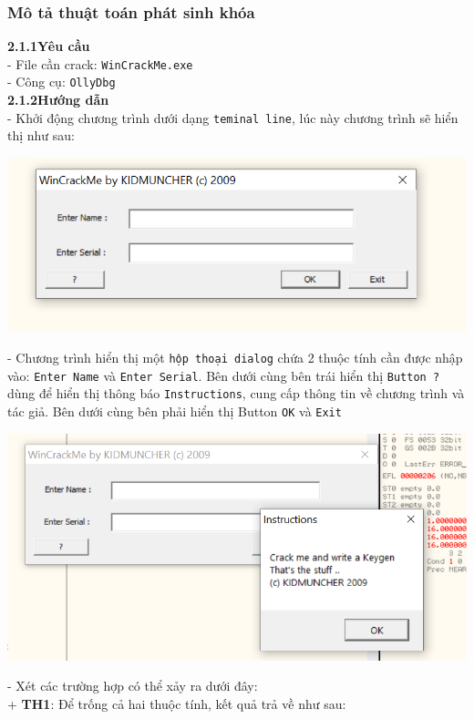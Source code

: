 \subsubsection{Mô tả thuật toán phát sinh khóa}
\noindent\textbf{2.1.1\quad Yêu cầu}\\
- File cần crack: \texttt{WinCrackMe.exe}\\
- Công cụ: \texttt{OllyDbg}\\
\noindent\textbf{2.1.2\quad Hướng dẫn}\\
- Khởi động chương trình dưới dạng \texttt{teminal line}, lúc này chương trình sẽ hiển thị như sau:
\begin{center}
    \includegraphics[width=\textwidth]{img/file-2/demo1.PNG}
\end{center}
- Chương trình hiển thị một  \texttt{hộp thoại dialog} chứa 2 thuộc tính cần được nhập vào: \texttt{Enter Name} và \texttt{Enter Serial}. Bên dưới cùng bên trái hiển thị \texttt{Button ?} dùng để hiển thị thông báo \texttt{Instructions}, cung cấp thông tin về chương trình và tác giả. Bên dưới cùng bên phải hiển thị Button \texttt{OK} và \texttt{Exit}\\
\begin{center}
    \includegraphics[width=\textwidth]{img/file-2/demo2.PNG}
\end{center}
- Xét các trường hợp có thể xảy ra dưới đây:\\
+ \textbf{TH1}: Để trống cả hai thuộc tính, kết quả trả về như sau:
